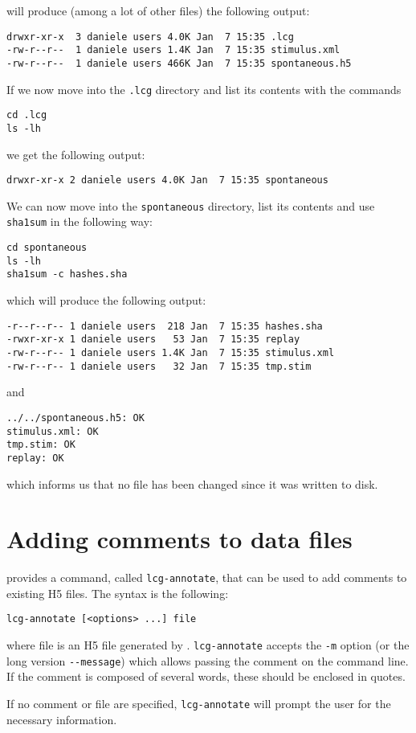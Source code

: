 will produce (among a lot of other files) the following output:
\begin{verbatim}
drwxr-xr-x  3 daniele users 4.0K Jan  7 15:35 .lcg
-rw-r--r--  1 daniele users 1.4K Jan  7 15:35 stimulus.xml
-rw-r--r--  1 daniele users 466K Jan  7 15:35 spontaneous.h5
\end{verbatim}
If we now move into the \verb+.lcg+ directory and list its contents
with the commands
\begin{lstlisting}
cd .lcg
ls -lh
\end{lstlisting}
we get the following output:
\begin{verbatim}
drwxr-xr-x 2 daniele users 4.0K Jan  7 15:35 spontaneous
\end{verbatim}
We can now move into the \verb+spontaneous+ directory, list its
contents and use \verb+sha1sum+ in the following way:
\begin{lstlisting}
cd spontaneous
ls -lh
sha1sum -c hashes.sha
\end{lstlisting}
which will produce the following output:
\begin{verbatim}
-r--r--r-- 1 daniele users  218 Jan  7 15:35 hashes.sha
-rwxr-xr-x 1 daniele users   53 Jan  7 15:35 replay
-rw-r--r-- 1 daniele users 1.4K Jan  7 15:35 stimulus.xml
-rw-r--r-- 1 daniele users   32 Jan  7 15:35 tmp.stim
\end{verbatim}
and
\begin{verbatim}
../../spontaneous.h5: OK
stimulus.xml: OK
tmp.stim: OK
replay: OK
\end{verbatim}
which informs us that no file has been changed since it was
written to disk.

\section{Adding comments to data files}
\progname provides a command, called \verb+lcg-annotate+, that can be
used to add comments to existing H5 files. The syntax is the
following:
\begin{verbatim}
lcg-annotate [<options> ...] file
\end{verbatim}
where file is an H5 file generated by \progname. \verb+lcg-annotate+
accepts the \verb+-m+ option (or the long version \verb+--message+)
which allows passing the comment on the command line. If the comment
is composed of several words, these should be enclosed in quotes.

If no comment or file are specified, \verb+lcg-annotate+ will prompt
the user for the necessary information.
